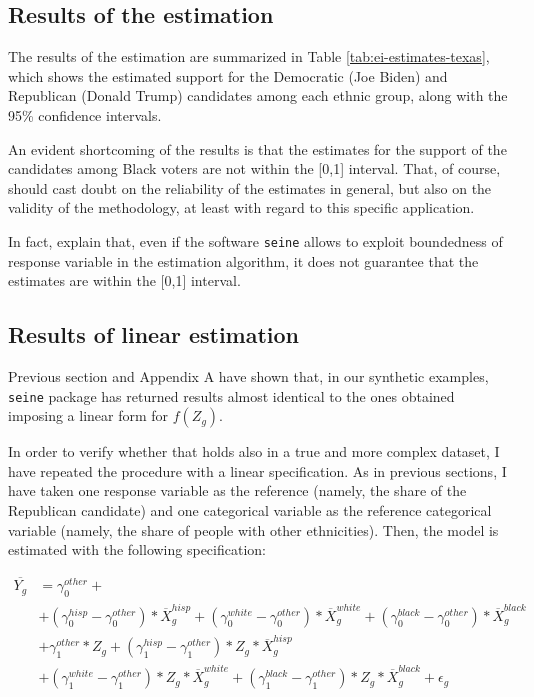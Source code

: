 \subsection{Results of the estimation}

The results of the estimation are summarized in Table \ref{tab:ei-estimates-texas}, which shows the estimated support for the Democratic (Joe Biden) and Republican (Donald Trump) candidates among each ethnic group, along with the 95\% confidence intervals.




An evident shortcoming of the results is that the estimates for the support of the candidates among Black voters are not within the [0,1] interval.
That, of course, should cast doubt on the reliability of the estimates in general, but also on the validity of the methodology, at least with regard to this specific application.

In fact, \citet{mccartan2025identificationsemiparametricestimationconditional} explain that, even if the software \texttt{seine} allows to exploit boundedness of response variable in the estimation algorithm, it does not guarantee that the estimates are within the [0,1] interval.


\subsection{Results of linear estimation}

Previous section and Appendix A have shown that, in our synthetic examples, \texttt{seine} package has returned results almost identical to the ones obtained imposing a linear form for $f(Z_g)$.

In order to verify whether that holds also in a true and more complex dataset, I have repeated the procedure with a linear specification. As in previous sections, I have taken one response variable as the reference (namely, the share of the Republican candidate) and one categorical variable as the reference categorical variable (namely, the share of people with other ethnicities).
Then, the model is estimated with the following specification:

\begin{align*}
    \overline{Y_g} & = \gamma_0^{other}+\\
    & +(\gamma_0^{hisp}-\gamma_0^{other})*\overline{X}_g^{hisp}+(\gamma_0^{white}-\gamma_0^{other})*\overline{X}_g^{white}+(\gamma_0^{black}-\gamma_0^{other})*\overline{X}_g^{black} \\
    & +\gamma_1^{other}*Z_g+(\gamma_1^{hisp}-\gamma_1^{other})*Z_g*\overline{X}_g^{hisp}\\
    & +(\gamma_1^{white}-\gamma_1^{other})*Z_g*\overline{X}_g^{white}+(\gamma_1^{black}-\gamma_1^{other})*Z_g*\overline{X}_g^{black}+\epsilon_g
\end{align*}

